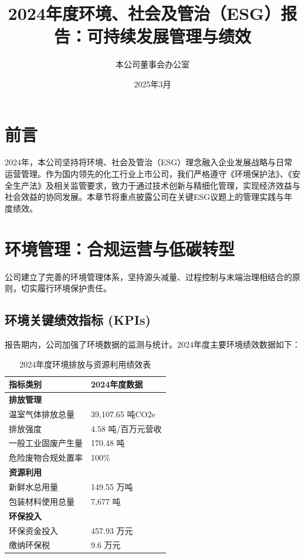 \documentclass[a4paper,12pt]{article}
\title{\textbf{2024年度环境、社会及管治（ESG）报告：可持续发展管理与绩效}}
\author{本公司董事会办公室}
\date{2025年3月}
\begin{document}
\maketitle

\section*{前言}

2024年，本公司坚持将环境、社会及管治（ESG）理念融入企业发展战略与日常运营管理。作为国内领先的化工行业上市公司，我们严格遵守《环境保护法》、《安全生产法》及相关监管要求，致力于通过技术创新与精细化管理，实现经济效益与社会效益的协同发展。本章节将重点披露公司在关键ESG议题上的管理实践与年度绩效。

\section{环境管理：合规运营与低碳转型}

公司建立了完善的环境管理体系，坚持源头减量、过程控制与末端治理相结合的原则，切实履行环境保护责任。

\subsection{环境关键绩效指标 (KPIs)}

报告期内，公司加强了环境数据的监测与统计。2024年度主要环境绩效数据如下：

\begin{table}[H]
\centering
\caption{2024年度环境排放与资源利用绩效表}
\begin{tabular}{@{}ll@{}}
\toprule
\textbf{指标类别} & \textbf{2024年度数据} \\ \midrule
\textbf{排放管理} & \\
温室气体排放总量 & 39,107.65 吨CO2e \\
排放强度 & 4.58 吨/百万元营收 \\
一般工业固废产生量 & 170.48 吨 \\
危险废物合规处置率 & 100\% \\
\midrule
\textbf{资源利用} & \\
新鲜水总用量 & 149.55 万吨 \\
包装材料使用总量 & 7,677 吨 \\
\midrule
\textbf{环保投入} & \\
环保资金投入 & 457.93 万元 \\
缴纳环保税 & 9.6 万元 \\ \bottomrule
\end{tabular}
\end{table}
\end{document}
